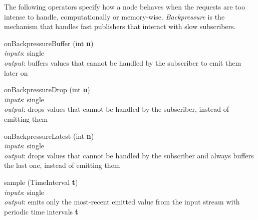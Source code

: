 \documentclass{dithesis}
\begin{document}
The following operators specify how a node behaves when the requests are too intense to handle, computationally or memory-wise. \textit{Backpressure} is the mechanism that handles fast publishers that interact with slow subscribers.
\begin{description}

\begin{minipage}[c]{\lll}
\item[onBackpressureBuffer] (int \textbf{n})\\
	\textit{inputs}: single \\
	\textit{output}: buffers values that cannot be handled by the subscriber to emit them later on
\end{minipage}
\hfill
\newline \newline \newline
\begin{minipage}[c]{\lll}
\item[onBackpressureDrop] (int \textbf{n})\\
	\textit{inputs}: single \\
	\textit{output}: drops values that cannot be handled by the subscriber, instead of emitting them
\end{minipage}
\hfill
\newline \newline \newline
\begin{minipage}[c]{\lll}
\item[onBackpressureLatest] (int \textbf{n})\\
	\textit{inputs}: single \\
	\textit{output}: drops values that cannot be handled by the subscriber and always buffers the last one, instead of emitting them
\end{minipage}
\hfill
\newline \newline \newline
\begin{minipage}[c]{\lll}
\item[sample] (TimeInterval \textbf{t})\\
	\textit{inputs}: single \\
	\textit{output}: emits only the most-recent emitted value from the input stream with periodic time intervals \textbf{t}
\end{minipage}
\hfill
\begin{minipage}[c]{\rrr}

\end{minipage}
\end{description}
\end{document}
